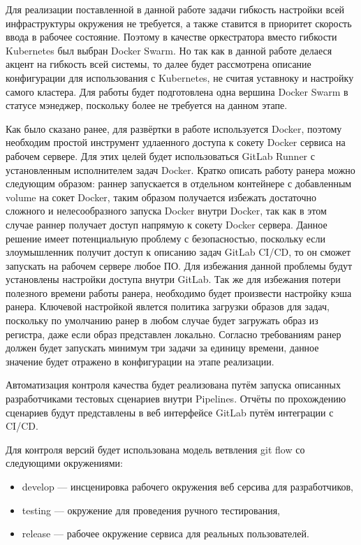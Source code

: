 Для реализации поставленной в данной работе задачи гибкость настройки всей инфраструктуры окружения не требуется, а также ставится в приоритет скорость ввода в рабочее состояние.
Поэтому в качестве оркестратора вместо гибкости Kubernetes был выбран Docker Swarm.
Но так как в данной работе делаеся акцент на гибкость всей системы, то далее будет рассмотрена описание конфигурации для использования с Kubernetes, не считая уставноку и настройку самого кластера.
Для работы будет подготовлена одна вершина Docker Swarm в статусе мэнеджер, поскольку более не требуется на данном этапе.

Как было сказано ранее, для развёртки в работе используется Docker, поэтому необходим простой инструмент удлаенного доступа к сокету Docker сервиса на рабочем сервере.
Для этих целей будет использоваться GitLab Runner с установленным исполнителем задач Docker.
Кратко описать работу ранера можно следующим образом: раннер запускается в отдельном контейнере с добавленным volume на сокет Docker,
таким образом получается избежать достаточно сложного и нелесообразного запуска Docker внутри Docker,
так как в этом случае раннер получает доступ напрямую к сокету Docker сервера.
Данное решение имеет потенциальную проблему с безопасностью, поскольку если злоумышленник получит доступ к описанию задач GitLab CI/CD, то он сможет запускать на рабочем сервере любое ПО.
Для избежания данной проблемы будут установлены настройки доступа внутри GitLab.
Так же для избежания потери полезного времени работы ранера, необходимо будет произвести настройку кэша ранера.
Ключевой настройкой явлется политика загрузки образов для задач, поскольку по умолчанию ранер в любом случае будет загружать образ из регистра, даже если образ представлен локально.
Согласно требованиям ранер должен будет запускать минимум три задачи за единицу времени, данное значение будет отражено в конфигурации на этапе реализации.

Автоматизация контроля качества будет реализована путём запуска описанных разработчиками тестовых сценариев внутри Pipelines.
Отчёты по прохождению сценариев будут представлены в веб интерфейсе GitLab путём интеграции с CI/CD.

Для контроля версий будет использована модель ветвления git flow со следующими окружениями:

\begin{itemize}
    \item develop --- инсценировка рабочего окружения веб серсива для разработчиков,
    \item testing --- окружение для проведения ручного тестирования,
    \item release --- рабочее окружение сервиса для реальных пользователей.
\end{itemize}

